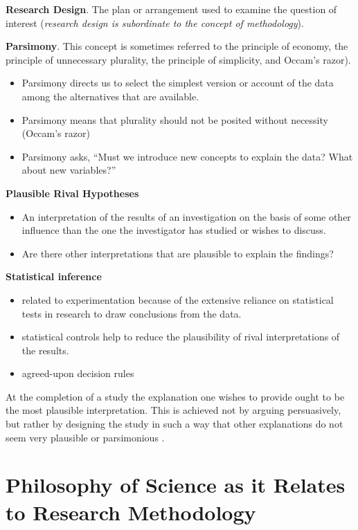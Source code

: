 \documentclass[
  english,
]{book}
\providecommand{\tightlist}{%
  \setlength{\itemsep}{0pt}\setlength{\parskip}{0pt}}
\begin{document}
\textbf{Research Design}. The plan or arrangement used to examine the question of interest (\emph{research design is subordinate to the concept of methodology}).

\textbf{Parsimony}. This concept is sometimes referred to the principle of economy, the principle of unnecessary plurality, the principle of simplicity, and Occam's razor).

\begin{itemize}
\tightlist
\item
  Parsimony directs us to select the simplest version or account of the data among the alternatives that are available.
\item
  Parsimony means that plurality should not be posited without necessity (Occam's razor)
\item
  Parsimony asks, ``Must we introduce new concepts to explain the data? What about new variables?''
\end{itemize}

\textbf{Plausible Rival Hypotheses}

\begin{itemize}
\tightlist
\item
  An interpretation of the results of an investigation on the basis of some other influence than the one the investigator has studied or wishes to discuss.
\item
  Are there other interpretations that are plausible to explain the findings?
\end{itemize}

\textbf{Statistical inference}

\begin{itemize}
\tightlist
\item
  related to experimentation because of the extensive reliance on statistical tests in research to draw conclusions from the data.
\item
  statistical controls help to reduce the plausibility of rival interpretations of the results.
\item
  agreed-upon decision rules
\end{itemize}

At the completion of a study the explanation one wishes to provide ought to be the most plausible interpretation. This is achieved not by arguing persuasively, but rather by designing the study in such a way that other explanations do not seem very plausible or parsimonious \citep{kazdin_research_2017}.

\hypertarget{philosophy-of-science-as-it-relates-to-research-methodology}{%
\section{Philosophy of Science as it Relates to Research Methodology}\label{philosophy-of-science-as-it-relates-to-research-methodology}}
\end{document}
